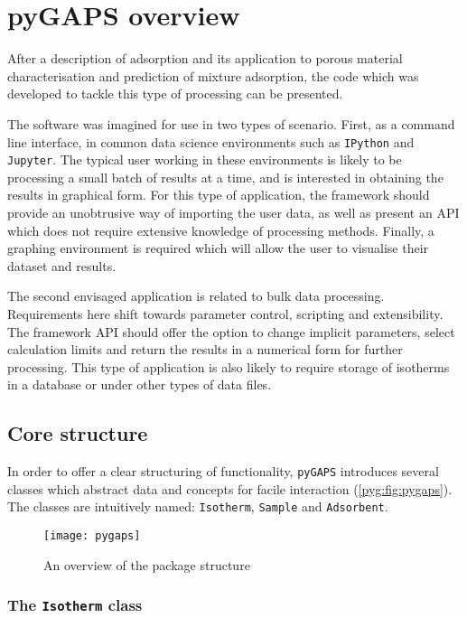 
\section{pyGAPS overview}

After a description of adsorption and its application to porous
material characterisation and prediction of mixture
adsorption, the code which was developed to tackle this type 
of processing can be presented.

The software was imagined for use in two types of scenario.
First, as a command line interface, in common data science environments
such as \texttt{IPython} and \texttt{Jupyter}. The typical user working
in these environments is likely to be processing a small batch of
results at a time, and is interested in obtaining the results in
graphical form. For this type of application, the framework should
provide an unobtrusive way of importing the user data, as well as
present an \gls{API} which does not require extensive knowledge of 
processing methods. Finally, a graphing environment is
required which will allow the user to visualise their
dataset and results.

The second envisaged application is related to bulk data processing.
Requirements here shift towards parameter control, scripting and
extensibility. The framework \gls{API} should offer the option to change 
implicit parameters, select calculation limits and return the results
in a numerical form for further processing. This type of application 
is also likely to require storage of isotherms in a database or
under other types of data files.

\subsection{Core structure}

In order to offer a clear structuring of functionality, 
\texttt{pyGAPS} introduces several classes which abstract data and
concepts for facile interaction (\autoref{pyg:fig:pygaps}). The classes are
intuitively named: \texttt{Isotherm}, \texttt{Sample} and \texttt{Adsorbent}.

\begin{figure}[htb]
    \centering
    \texttt{[image: pygaps]}%
	\caption{An overview of the package structure}%
\label{pyg:fig:pygaps}
\end{figure}

\subsubsection{The \texttt{Isotherm} class}


